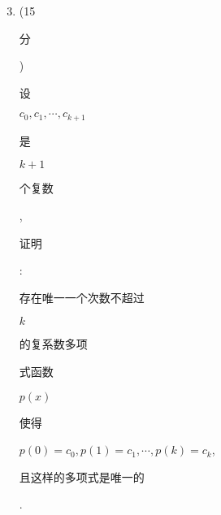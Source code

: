 \documentclass[10pt]{article}
\begin{document}
\begin{enumerate}
  \setcounter{enumi}{2}
  \item (15 \begin{CJK}{UTF8}{mj}分\end{CJK}) \begin{CJK}{UTF8}{mj}设\end{CJK} $c_{0}, c_{1}, \cdots, c_{k+1}$ \begin{CJK}{UTF8}{mj}是\end{CJK} $k+1$ \begin{CJK}{UTF8}{mj}个复数\end{CJK}, \begin{CJK}{UTF8}{mj}证明\end{CJK}: \begin{CJK}{UTF8}{mj}存在唯一一个次数不超过\end{CJK} $k$ \begin{CJK}{UTF8}{mj}的复系数多项\end{CJK} \begin{CJK}{UTF8}{mj}式函数\end{CJK} $p(x)$ \begin{CJK}{UTF8}{mj}使得\end{CJK} $p(0)=c_{0}, p(1)=c_{1}, \cdots, p(k)=c_{k}$, \begin{CJK}{UTF8}{mj}且这样的多项式是唯一的\end{CJK}.


\end{enumerate}
\end{document}
